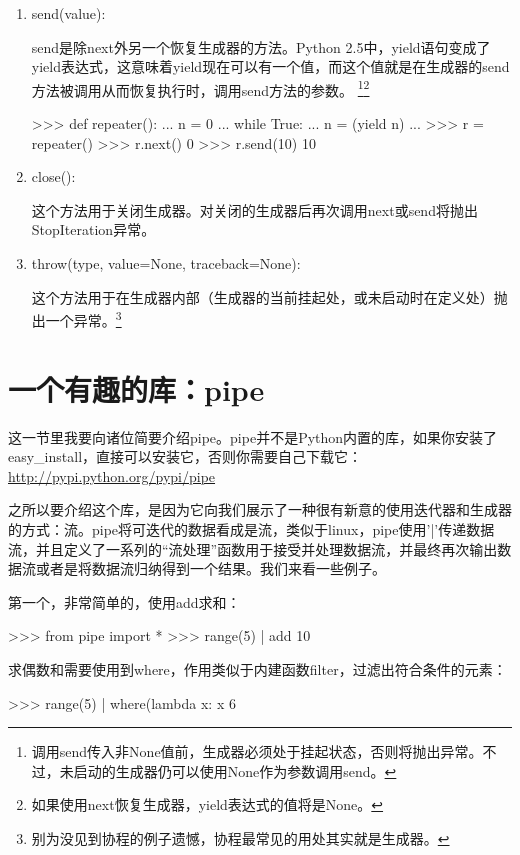 \documentclass[12pt,a4paper]{report}
\begin{document}
\begin{enumerate} 
    \item send(value):

        send是除next外另一个恢复生成器的方法。Python 2.5中，yield语句变成了yield表达式，这意味着yield现在可以有一个值，而这个值就是在生成器的send方法被调用从而恢复执行时，调用send方法的参数。 \footnote{调用send传入非None值前，生成器必须处于挂起状态，否则将抛出异常。不过，未启动的生成器仍可以使用None作为参数调用send。}\footnote{如果使用next恢复生成器，yield表达式的值将是None。}
        \begin{python}[moreemph={[4]42},caption={},label=ex1]
>>> def repeater():
...   n = 0
...   while True:
...     n = (yield n)
...
>>> r = repeater()
>>> r.next()
0
>>> r.send(10)
10
        \end{python}
    \item close():
       
        这个方法用于关闭生成器。对关闭的生成器后再次调用next或send将抛出StopIteration异常。
    \item throw(type, value=None, traceback=None):

        这个方法用于在生成器内部（生成器的当前挂起处，或未启动时在定义处）抛出一个异常。\footnote{别为没见到协程的例子遗憾，协程最常见的用处其实就是生成器。}
\end{enumerate}

\section{一个有趣的库：pipe}

这一节里我要向诸位简要介绍pipe。pipe并不是Python内置的库，如果你安装了easy\_install，直接可以安装它，否则你需要自己下载它：\url{http://pypi.python.org/pypi/pipe} 

之所以要介绍这个库，是因为它向我们展示了一种很有新意的使用迭代器和生成器的方式：流。pipe将可迭代的数据看成是流，类似于linux，pipe使用'|'传递数据流，并且定义了一系列的“流处理”函数用于接受并处理数据流，并最终再次输出数据流或者是将数据流归纳得到一个结果。我们来看一些例子。

第一个，非常简单的，使用add求和：
        \begin{python}[moreemph={[4]42},caption={},label=ex1]
>>> from pipe import *
>>> range(5) | add
10
        \end{python}

求偶数和需要使用到where，作用类似于内建函数filter，过滤出符合条件的元素：
        \begin{python}[moreemph={[4]42},caption={},label=ex1]
>>> range(5) | where(lambda x: x %
6
        \end{python}
\end{document}
